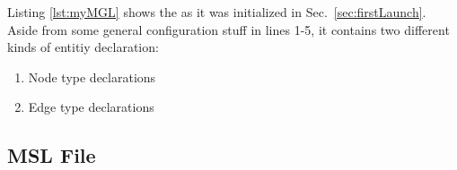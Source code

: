 \documentclass[a4paper,american,12pt]{scrreprt}
\begin{document}

Listing \ref{lst:myMGL} shows the  as it was initialized in
Sec.~\ref{sec:firstLaunch}. Aside from some general configuration stuff in lines
1-5, it contains two different kinds of entitiy declaration:
\begin{enumerate}
\item Node type declarations
\item Edge type declarations
\end{enumerate}

\subsection{MSL File}




%
%




\end{document}
